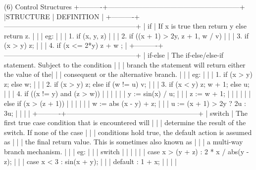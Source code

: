 (6) Control Structures
+----------+---------------------------------------------------------+
|STRUCTURE | DEFINITION                                              |
+----------+---------------------------------------------------------+
| if       | If x is true then return y else return z.               |
|          | eg:                                                     |
|          | 1. if (x, y, z)                                         |
|          | 2. if ((x + 1) > 2y, z + 1, w / v)                      |
|          | 3. if (x > y) z;                                        |
|          | 4. if (x <= 2*y) { z + w };                             |
+----------+---------------------------------------------------------+
| if-else  | The if-else/else-if statement. Subject to the condition |
|          | branch the statement will return either the value of the|
|          | consequent or the alternative branch.                   |
|          | eg:                                                     |
|          | 1. if (x > y) z; else w;                                |
|          | 2. if (x > y) z; else if (w != u) v;                    |
|          | 3. if (x < y) { z; w + 1; } else u;                     |
|          | 4. if ((x != y) and (z > w))                            |
|          |    {                                                    |
|          |      y := sin(x) / u;                                   |
|          |      z := w + 1;                                        |
|          |    }                                                    |
|          |    else if (x > (z + 1))                                |
|          |    {                                                    |
|          |      w := abs (x - y) + z;                              |
|          |      u := (x + 1) > 2y ? 2u : 3u;                       |
|          |    }                                                    |
+----------+---------------------------------------------------------+
| switch   | The first true case condition that is encountered will  |
|          | determine the result of the switch. If none of the case |
|          | conditions hold true, the default action is assumed as  |
|          | the final return value. This is sometimes also known as |
|          | a multi-way branch mechanism.                           |
|          | eg:                                                     |
|          | switch                                                  |
|          | {                                                       |
|          |   case x > (y + z) : 2 * x / abs(y - z);                |
|          |   case x < 3       : sin(x + y);                        |
|          |   default          : 1 + x;                             |
|          | }                                                       |
